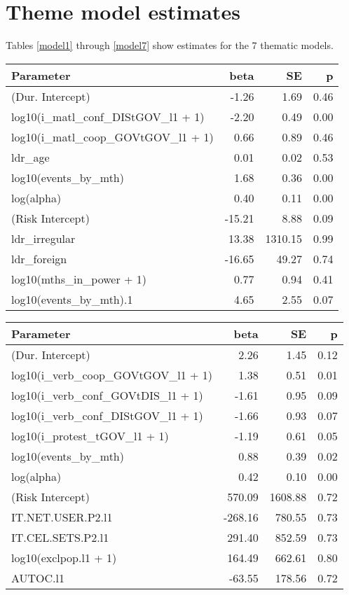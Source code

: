 \documentclass[pdftex,11pt]{article}
\begin{document}
\section{Theme model estimates}

Tables \ref{model1} through \ref{model7} show estimates for the 7 thematic models.

\begin{table*}[ht]
\centering
\begin{tabular}{lrrr}
  \hline
Parameter & beta & SE & p \\ 
  \hline
(Dur. Intercept) & -1.26 & 1.69 & 0.46 \\ 
  log10(i\_matl\_conf\_DIStGOV\_l1 + 1) & -2.20 & 0.49 & 0.00 \\ 
  log10(i\_matl\_coop\_GOVtGOV\_l1 + 1) & 0.66 & 0.89 & 0.46 \\ 
  ldr\_age & 0.01 & 0.02 & 0.53 \\ 
  log10(events\_by\_mth) & 1.68 & 0.36 & 0.00 \\ 
  log(alpha) & 0.40 & 0.11 & 0.00 \\ 
  (Risk Intercept) & -15.21 & 8.88 & 0.09 \\ 
  ldr\_irregular & 13.38 & 1310.15 & 0.99 \\ 
  ldr\_foreign & -16.65 & 49.27 & 0.74 \\ 
  log10(mths\_in\_power + 1) & 0.77 & 0.94 & 0.41 \\ 
  log10(events\_by\_mth).1 & 4.65 & 2.55 & 0.07 \\ 
   \hline
\end{tabular}
\caption{Leaders} 
\label{model1}
\end{table*}
\begin{table*}[ht]
\centering
\begin{tabular}{lrrr}
  \hline
Parameter & beta & SE & p \\ 
  \hline
(Dur. Intercept) & 2.26 & 1.45 & 0.12 \\ 
  log10(i\_verb\_coop\_GOVtGOV\_l1 + 1) & 1.38 & 0.51 & 0.01 \\ 
  log10(i\_verb\_conf\_GOVtDIS\_l1 + 1) & -1.61 & 0.95 & 0.09 \\ 
  log10(i\_verb\_conf\_DIStGOV\_l1 + 1) & -1.66 & 0.93 & 0.07 \\ 
  log10(i\_protest\_tGOV\_l1 + 1) & -1.19 & 0.61 & 0.05 \\ 
  log10(events\_by\_mth) & 0.88 & 0.39 & 0.02 \\ 
  log(alpha) & 0.42 & 0.10 & 0.00 \\ 
  (Risk Intercept) & 570.09 & 1608.88 & 0.72 \\ 
  IT.NET.USER.P2.l1 & -268.16 & 780.55 & 0.73 \\ 
  IT.CEL.SETS.P2.l1 & 291.40 & 852.59 & 0.73 \\ 
  log10(exclpop.l1 + 1) & 164.49 & 662.61 & 0.80 \\ 
  AUTOC.l1 & -63.55 & 178.56 & 0.72 \\ 
   \hline
\end{tabular}
\caption{Public Discontent} 
\label{model2}
\end{table*}
\end{document}
